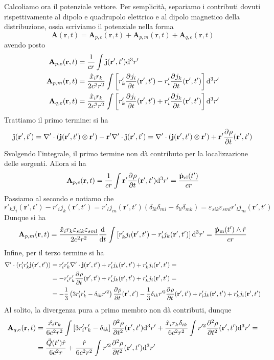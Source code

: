 \documentclass{article}
\renewcommand{\vec}[1]{\mathbf{#1}}
\begin{document}
\begin{enumerate}
	Calcoliamo ora il potenziale vettore. Per semplicità, separiamo i contributi dovuti rispettivamente al dipolo e quadrupolo elettrico e al dipolo magnetico della distribuzione, ossia scriviamo il potenziale nella forma
	\[\vec{A}(\vec{r},t)=\vec{A}_{p,e}(\vec{r},t)+\vec{A}_{p,m}(\vec{r},t)+\vec{A}_{q,e}(\vec{r},t)\]
	avendo posto
	\begin{align*}
		\vec{A}_{p,e}(\vec{r},t)&=\frac{1}{cr}\int\vec{j}(\vec{r}',t')\d ^3r'\\\vec{A}_{p,m}(\vec{r},t)&=\frac{\hat{x}_ir_k}{2c^2r^2}\int\left[r'_k\pder{j_i}{t}(\vec{r}',t')-r'_i\pder{j_k}{t}(\vec{r}',t')\right]\d ^3r'\\\vec{A}_{q,e}(\vec{r},t)&=\frac{\hat{x}_ir_k}{2c^2r^2}\int\left[r'_k\pder{j_i}{t}(\vec{r}',t')+r'_i\pder{j_k}{t}(\vec{r}',t')\right]\d ^3r'
	\end{align*}
	Trattiamo il primo termine: si ha
	\[\vec{j}(\vec{r}',t')=\nabla'\cdot(\vec{j}(\vec{r}',t')\otimes\vec{r}')-\vec{r}'\nabla'\cdot\vec{j}(\vec{r}',t')=\nabla'\cdot(\vec{j}(\vec{r}',t')\otimes\vec{r}')+\vec{r}'\pder{\rho}{t}(\vec{r}',t')\]
	Svolgendo l'integrale, il primo termine non dà contributo per la localizzazione delle sorgenti. Allora si ha
	\[\vec{A}_{p,e}(\vec{r},t)=\frac{1}{cr}\int\vec{r}'\pder{\rho}{t}(\vec{r}',t')\d ^3r'=\frac{\dot{\vec{p}}_\textrm{el}(t')}{cr}\]
	Passiamo al secondo e notiamo che
	\[r'_kj_i(\vec{r}',t')-r'_ij_k(\vec{r}',t')=r'_lj_m(\vec{r}',t')(\delta_{lk}\delta_{mi}-\delta_{li}\delta_{mk})=\varepsilon_{sik}\varepsilon_{sml}r'_lj_m(\vec{r}',t')\]
	Dunque si ha
	\[\vec{A}_{p,m}(\vec{r},t)=\frac{\hat{x}_ir_k\varepsilon_{sik}\varepsilon_{sml}}{2c^2r^2}\der{}{t}\int\left[r'_kj_i(\vec{r}',t')-r'_ij_k(\vec{r}',t')\right]\d ^3r'=\frac{\dot{\vec{p}}_\textrm{m}(t')\wedge\hat{r}}{cr}\]
	Infine, per il terzo termine si ha
	\begin{align*}\nabla'\cdot(r'_ir'_k\vec{j}(\vec{r}',t'))&=r'_ir'_k\nabla'\cdot\vec{j}(\vec{r}',t')+r'_ij_k(\vec{r}',t')+r'_kj_i(\vec{r}',t')=\\&=-r'_ir'_k\pder{\rho}{t}(\vec{r}',t')+r'_ij_k(\vec{r}',t')+r'_kj_i(\vec{r}',t')=\\&=-\frac{1}{3}\left(3r'_ir'_k-\delta_{ik}r'^2\right)\pder{\rho}{t}(\vec{r}',t')-\frac{1}{3}\delta_{ik}r'^2\pder{\rho}{t}(\vec{r}',t')+r'_ij_k(\vec{r}',t')+r'_kj_i(\vec{r}',t')\end{align*}
	Al solito, la divergenza pura a primo membro non dà contributi, dunque
	\begin{align*}\vec{A}_{q,e}(\vec{r},t)&=\frac{\hat{x_i}r_k}{6c^2r^2}\int\left[3r'_ir'_k-\delta_{ik}\right]\pder[2]{\rho}{t}(\vec{r}',t')\d^3r'+\frac{\hat{x}_ir_k\delta_{ik}}{6c^2r^2}\int r'^2\pder[2]{\rho}{t}(\vec{r}',t')\d ^3r'=\\&=\frac{\ddot{Q}(t')\hat{r}}{6c^2r}+\frac{\hat{r}}{6c^2r^2}\int r'^2\pder[2]{\rho}{t}(\vec{r}',t')\d ^3r'\end{align*}

\end{enumerate}
\end{document}
